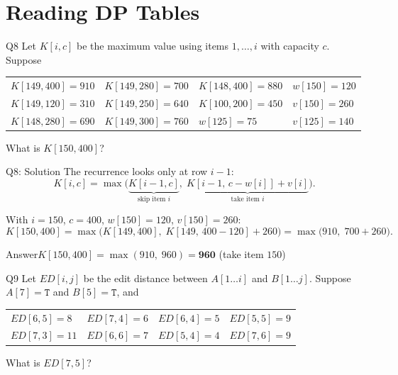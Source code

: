 \documentclass[10pt,aspectratio=169]{beamer}
\newcommand{\answer}[1]{\begin{alertblock}{Answer}#1\end{alertblock}}
\begin{document}
\section{Reading DP Tables}

\begin{frame}{Q8}
  Let $K[i,c]$ be the maximum value using items $1, \ldots, i$ with capacity $c$.
  Suppose

  \begin{center}
  \begin{tabular}{llll}
    $K[149, 400] = 910$ & $K[149, 280] = 700$ & $K[148, 400] = 880$ & $w[150] = 120$ \\
    $K[149, 120] = 310$ & $K[149, 250] = 640$ & $K[100, 200] = 450$ & $v[150] = 260$ \\
    $K[148, 280] = 690$ & $K[149, 300] = 760$ & $w[125] = 75$       & $v[125] = 140$ \\
  \end{tabular}
  \end{center}

  \bigskip
  \begin{center}
    \Large What is $K[150, 400]$?
  \end{center}
\end{frame}

\begin{frame}{Q8: Solution}
  The recurrence looks only at row $i-1$:
  \[
    K[i,c] = \max\big( \underbrace{K[i-1,c]}_{\text{skip item } i},\;
                       \underbrace{K[i-1,\, c - w[i]] + v[i]}_{\text{take item } i} \big).
  \]

  \bigskip
  With $i = 150$, $c = 400$, $w[150] = 120$, $v[150] = 260$:
  \[
    K[150,400] = \max\big( K[149,400],\; K[149,\, 400-120] + 260 \big)
               = \max\big( 910,\; 700 + 260 \big).
  \]

  \answer{$K[150,400] = \max(910,\; 960) = \mathbf{960}$ \quad (take item $150$)}
\end{frame}

\begin{frame}{Q9}
  Let $ED[i,j]$ be the edit distance between $A[1 \ldots i]$ and
  $B[1 \ldots j]$. Suppose $A[7] = \texttt{T}$ and $B[5] = \texttt{T}$, and

  \begin{center}
  \begin{tabular}{llll}
    $ED[6,5] = 8$ & $ED[7,4] = 6$ & $ED[6,4] = 5$ & $ED[5,5] = 9$ \\
    $ED[7,3] = 11$ & $ED[6,6] = 7$ & $ED[5,4] = 4$ & $ED[7,6] = 9$ \\
  \end{tabular}
  \end{center}

  \bigskip
  \begin{center}
    \Large What is $ED[7,5]$?
  \end{center}
\end{frame}
\end{document}
